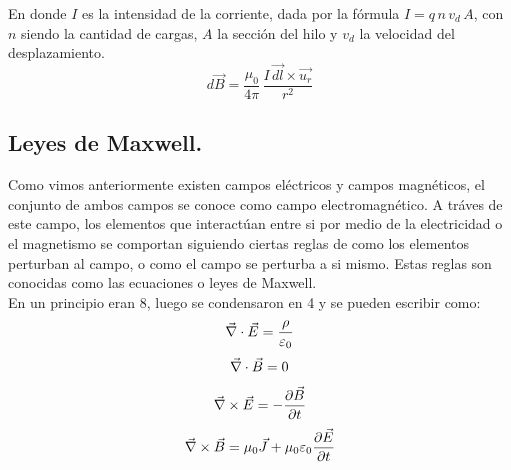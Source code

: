En donde $I$ es la intensidad de la corriente, dada por la fórmula $I=q\,n\,v_d\,A$, con $n$ siendo la cantidad de cargas, $A$ la sección del hilo y $v_d$ la velocidad del desplazamiento.
$$d\overrightarrow{B}=\frac{μ_0}{4\pi}\, \frac{I\,\overrightarrow{dl}\times \overrightarrow{u_r}}{r^2} $$
\subsection{Leyes de Maxwell.}\label{sec:Leyes de Maxwell}
Como vimos anteriormente existen campos eléctricos y campos magnéticos, el conjunto de ambos campos se conoce como campo electromagnético. A tráves de este campo, los elementos que interactúan entre si por medio de la electricidad o el magnetismo se comportan siguiendo ciertas reglas de como los elementos perturban al campo, o como el campo se perturba a si mismo. Estas reglas son conocidas como las ecuaciones o leyes de Maxwell.\\
En un principio eran 8, luego se condensaron en 4 y se pueden escribir como: 
\begin{equation}
\label{eq:maxwell1}
\vec {\nabla} \cdot\vec{E}=\frac{\rho}{\varepsilon_0}\\
\end{equation}
\begin{equation}
\label{eq:maxwell2}
\vec {\nabla} \cdot\vec{B}=0\\
\end{equation}
\begin{equation}
\label{eq:maxwell3}
\vec {\nabla} \times\vec{E}=-\frac{\partial \vec{B}}{\partial t}\\
\end{equation}
\begin{equation}
\label{eq:maxwell4}
\vec {\nabla} \times\vec{B}=\mu_0\vec{J}+\mu_0\varepsilon_0\frac{\partial \vec{E}}{\partial t}\\
\end{equation}
